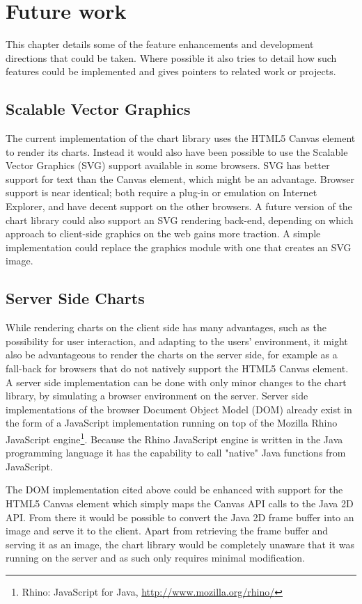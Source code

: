 \chapter{Future work}
This chapter details some of the feature enhancements and development directions that could be taken. Where possible it also tries to detail how such features could be implemented and gives pointers to related work or projects.

\section{Scalable Vector Graphics}
The current implementation of the chart library uses the HTML5 Canvas element to render its charts. Instead it would also have been possible to use the Scalable Vector Graphics (SVG) support available in some browsers. SVG has better support for text than the Canvas element, which might be an advantage. Browser support is near identical; both require a plug-in or emulation on Internet Explorer, and have decent support on the other browsers. A future version of the chart library could also support an SVG rendering back-end, depending on which approach to client-side graphics on the web gains more traction. A simple implementation could replace the graphics module with one that creates an SVG image.

\section{Server Side Charts}
While rendering charts on the client side has many advantages, such as the possibility for user interaction, and adapting to the users' environment, it might also be advantageous to render the charts on the server side, for example as a fall-back for browsers that do not natively support the HTML5 Canvas element. A server side implementation can be done with only minor changes to the chart library, by simulating a browser environment on the server. Server side implementations of the browser Document Object Model (DOM) already exist  in the form of a JavaScript implementation \cite{resig07} running on top of the Mozilla Rhino JavaScript engine\footnote{Rhino: JavaScript for Java, \url{http://www.mozilla.org/rhino/}}. Because the Rhino JavaScript engine is written in the Java programming language it has the capability to call "native" Java functions from JavaScript. 

The DOM implementation cited above could be enhanced with support for the HTML5 Canvas element which simply maps the Canvas API calls to the Java 2D API. From there it would be possible to convert the Java 2D frame buffer into an image and serve it to the client. Apart from retrieving the frame buffer and serving it as an image, the chart library would be completely unaware that it was running on the server and as such only requires minimal modification.

